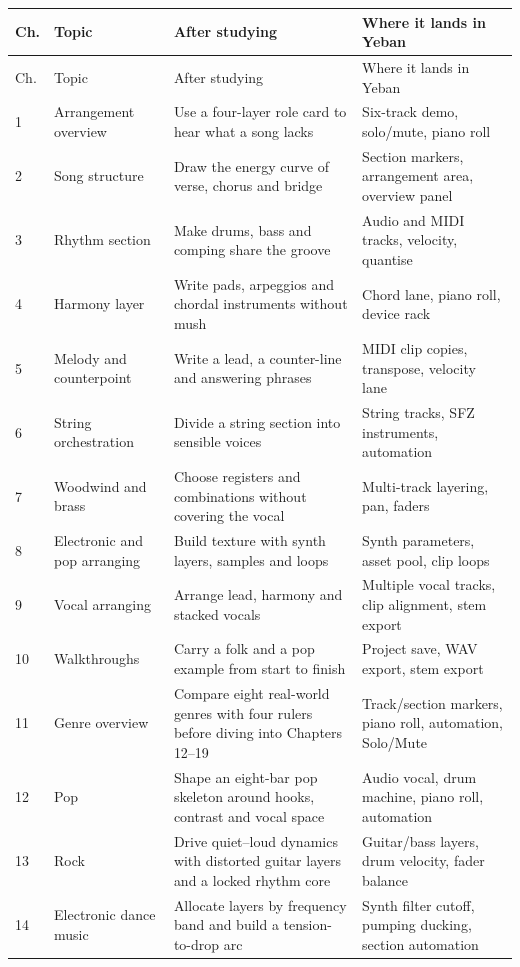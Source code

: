 \begin{longtable}{p{}p{}p{}p{}}
\toprule
Ch. & Topic & After studying & Where it lands in Yeban \\
\midrule
\endfirsthead
\toprule
Ch. & Topic & After studying & Where it lands in Yeban \\
\midrule
\endhead
1 & Arrangement overview & Use a four-layer role card to hear what a song lacks & Six-track demo, solo/mute, piano roll \\
2 & Song structure & Draw the energy curve of verse, chorus and bridge & Section markers, arrangement area, overview panel \\
3 & Rhythm section & Make drums, bass and comping share the groove & Audio and MIDI tracks, velocity, quantise \\
4 & Harmony layer & Write pads, arpeggios and chordal instruments without mush & Chord lane, piano roll, device rack \\
5 & Melody and counterpoint & Write a lead, a counter-line and answering phrases & MIDI clip copies, transpose, velocity lane \\
6 & String orchestration & Divide a string section into sensible voices & String tracks, SFZ instruments, automation \\
7 & Woodwind and brass & Choose registers and combinations without covering the vocal & Multi-track layering, pan, faders \\
8 & Electronic and pop arranging & Build texture with synth layers, samples and loops & Synth parameters, asset pool, clip loops \\
9 & Vocal arranging & Arrange lead, harmony and stacked vocals & Multiple vocal tracks, clip alignment, stem export \\
10 & Walkthroughs & Carry a folk and a pop example from start to finish & Project save, WAV export, stem export \\
11 & Genre overview & Compare eight real-world genres with four rulers before diving into Chapters 12--19 & Track/section markers, piano roll, automation, Solo/Mute \\
12 & Pop & Shape an eight-bar pop skeleton around hooks, contrast and vocal space & Audio vocal, drum machine, piano roll, automation \\
13 & Rock & Drive quiet--loud dynamics with distorted guitar layers and a locked rhythm core & Guitar/bass layers, drum velocity, fader balance \\
14 & Electronic dance music & Allocate layers by frequency band and build a tension-to-drop arc & Synth filter cutoff, pumping ducking, section automation \\

\end{longtable}
